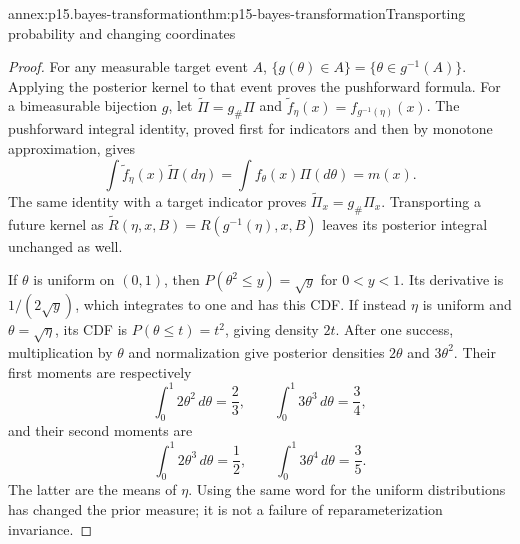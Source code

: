\begin{annexitem}{annex:p15.bayes-transformation}{thm:p15-bayes-transformation}{Transporting probability and changing coordinates}
\begin{proof}
For any measurable target event \(A\),
\(\{g(\theta)\in A\}=\{\theta\in g^{-1}(A)\}\).
Applying the posterior kernel to that event proves the
pushforward formula. For a bimeasurable bijection \(g\),
let \(\widetilde\Pi=g_\#\Pi\) and
\(\widetilde f_\eta(x)=f_{g^{-1}(\eta)}(x)\).
The pushforward integral identity, proved first for
indicators and then by monotone approximation, gives
\[
 \int\widetilde f_\eta(x)\widetilde\Pi(d\eta)
                       =\int f_\theta(x)\Pi(d\theta)=m(x).
\]
The same identity with a target indicator proves
\(\widetilde\Pi_x=g_\#\Pi_x\). Transporting a future kernel
as \(\widetilde R(\eta,x,B)=R(g^{-1}(\eta),x,B)\)
leaves its posterior integral unchanged as well.

If \(\theta\) is uniform on \((0,1)\), then
\(P(\theta^2\leq y)=\sqrt y\) for \(0<y<1\).
Its derivative is \(1/(2\sqrt y)\), which integrates to
one and has this CDF. If instead \(\eta\) is uniform
and \(\theta=\sqrt\eta\), its CDF is \(P(\theta\leq t)=t^2\),
giving density \(2t\).
After one success, multiplication by \(\theta\) and normalization
give posterior densities \(2\theta\) and \(3\theta^2\).
Their first moments are respectively
\[
 \int_0^1 2\theta^2\,d\theta=\frac23,\qquad
 \int_0^1 3\theta^3\,d\theta=\frac34,
\]
and their second moments are
\[
 \int_0^1 2\theta^3\,d\theta=\frac12,\qquad
 \int_0^1 3\theta^4\,d\theta=\frac35.
\]
The latter are the means of \(\eta\). Using the same word
for the uniform distributions has changed the prior
measure; it is not a failure of reparameterization invariance.
\end{proof}
\end{annexitem}

